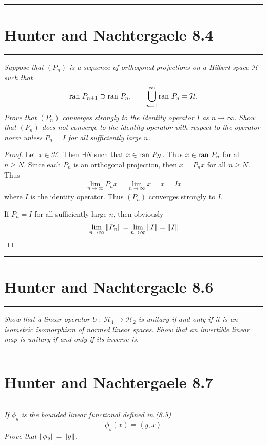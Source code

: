 \documentclass{article} %
\theoremstyle{plain}
\newcommand{\VEC}[2]{\left\langle #1, #2 \right\rangle}
\newcommand{\ran}{\text{\rm ran }}
\newcommand{\problem}[1]{
\vspace{.375cm}
\begin{minipage}{\textwidth}
    \begin{center}
        \noindent\rule{5cm}{1pt}
    \end{center}
    \section{\bf #1}
    \begin{center}
        \noindent\rule{5cm}{1pt}
    \end{center}
    \vspace{0.25cm}
\end{minipage}
}
\numberwithin{equation}{section} %
\numberwithin{figure}{section} %
\numberwithin{table}{section} %
\begin{document}
\problem{Hunter and Nachtergaele 8.4}
\emph{Suppose that $(P_n)$ is a sequence of orthogonal projections on a Hilbert space $\mathcal{H}$ such that $$\ran P_{n+1} \supset \ran P_n, \qquad \bigcup_{n=1}^\infty \ran P_n = \mathcal{H}.$$  Prove that $(P_n)$ converges strongly to the identity operator $I$ as $n \rightarrow \infty$.  Show that $(P_n)$ does not converge to the identity operator with respect to the operator norm unless $P_n = I$ for all sufficiently large $n$.} \\

\begin{proof}
    Let $x \in \mathcal{H}$.  Then $\exists N$ such that $x \in \ran P_N$.  Thus $x \in \ran P_n$ for all $n \geq N$.  Since each $P_n$ is an orthogonal projection, then $x = P_n x$ for all $n \geq N$.  Thus
    \begin{align*}
        \lim_{n\rightarrow \infty}P_n x = \lim_{n \rightarrow \infty} x = x = I x
    \end{align*}
    where $I$ is the identity operator.  Thus $(P_n)$ converges strongly to $I$.

    If $P_n = I$ for all sufficiently large $n$, then obviously
    \begin{align*}
        \lim_{n\rightarrow \infty} \norm{P_n} = \lim_{n\rightarrow \infty}\norm{I} = \norm{I}
    \end{align*}
\end{proof}









\problem{Hunter and Nachtergaele 8.6}
\emph{Show that a linear operator $U\ :\ \mathcal{H}_1 \rightarrow \mathcal{H}_2$ is unitary if and only if it is an isometric isomorphism of normed linear spaces.  Show that an invertible linear map is unitary if and only if its inverse is.}










\problem{Hunter and Nachtergaele 8.7}
\emph{If $\phi_y$ is the bounded linear functional defined in (8.5)}
\begin{equation}
    \tag{\it 8.5}
    \phi_y(x) = \VEC{y}{x}
\end{equation}
\emph{Prove that $\norm{\phi_y} = \norm{y}$.} \\
\end{document}
